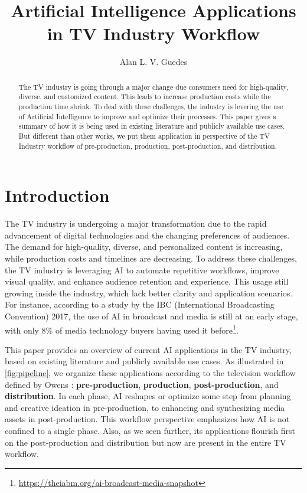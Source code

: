 \documentclass[sigconf,authorversion,review,authordraft]{webmedia}
\begin{document}

\title{Artificial Intelligence Applications in TV Industry Workflow}
\author{Alan L. V. Guedes}
\renewcommand{\shortauthors}{Guedes, A.L.G.}
\begin{abstract}
  The TV industry is going through a major change due consumers need for high-quality, diverse, and customized content. This leads to increase production costs while the  production time shrink. To deal with these challenges, the industry is levering the use of Artificial Intelligence to improve and optimize their processes. This paper gives a summary of how it is being used in existing literature and publicly available use cases. But different than other works, we put them application in perspective of the TV Industry workflow of pre-production, production, post-production, and distribution.
\end{abstract}
\maketitle

\section{Introduction}
\label{sec:introduction}

The TV industry is undergoing a major transformation due to the rapid advancement of digital technologies and the changing preferences of audiences. The demand for high-quality, diverse, and personalized content is increasing, while production costs and timelines are decreasing. To address these challenges, the TV industry is leveraging \ac{AI} to automate repetitive workflows, improve visual quality, and enhance audience retention and experience. This usage still growing inside the industry, which lack better clarity and application scenarios. For instance, according to a study by the IBC (International Broadcasting Convention) 2017, the use of \ac{AI} in broadcast and media is still at an early stage, with only 8\% of media technology buyers having used it before\footnote{\url{https://theiabm.org/ai-broadcast-media-snapshot}}.

This paper provides an overview of current \ac{AI} applications in the TV industry, based on existing literature and publicly available use cases. As illustrated in \autoref{fig:pipeline}, we organize these applications according to the television workflow defined by Owens \cite{owens2023}: \textbf{pre-production}, \textbf{production}, \textbf{post-production}, and \textbf{distribution}. In each phase, \ac{AI} reshapes or optimize some step from planning and creative ideation in pre-production, to enhancing and synthesizing media assets in post-production. This workflow perspective emphasizes how \ac{AI} is not confined to a single phase. Also, as we seen further, its applications flourish first on the post-production and distribution but now are present in the entire TV workflow.
\end{document}
